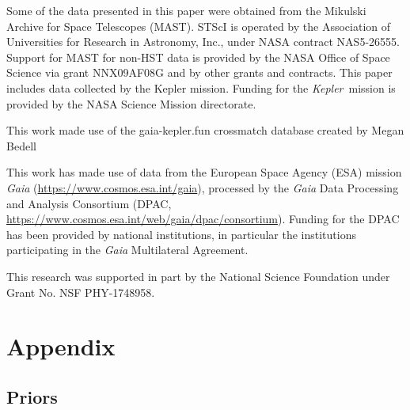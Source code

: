 \documentclass[useAMS, usenatbib, preprint, 12pt]{aastex}
\newcommand{\Kepler}{{\it Kepler}}
\begin{document}
Some of the data presented in this paper were obtained from the Mikulski
Archive for Space Telescopes (MAST).
STScI is operated by the Association of Universities for Research in
Astronomy, Inc., under NASA contract NAS5-26555.
Support for MAST for non-HST data is provided by the NASA Office of Space
Science via grant NNX09AF08G and by other grants and contracts.
This paper includes data collected by the Kepler mission. Funding for the
\Kepler\ mission is provided by the NASA Science Mission directorate.

This work made use of the gaia-kepler.fun crossmatch database created by Megan
Bedell

This work has made use of data from the European Space Agency (ESA) mission
{\it Gaia} (\url{https://www.cosmos.esa.int/gaia}), processed by the {\it Gaia}
Data Processing and Analysis Consortium (DPAC,
\url{https://www.cosmos.esa.int/web/gaia/dpac/consortium}). Funding for the DPAC
has been provided by national institutions, in particular the institutions
participating in the {\it Gaia} Multilateral Agreement.

This research was supported in part by the National Science Foundation under
Grant No. NSF PHY-1748958.


\section{Appendix}
\label{section:appendix}

\subsection*{Priors}
\label{section:priors}
\end{document}
